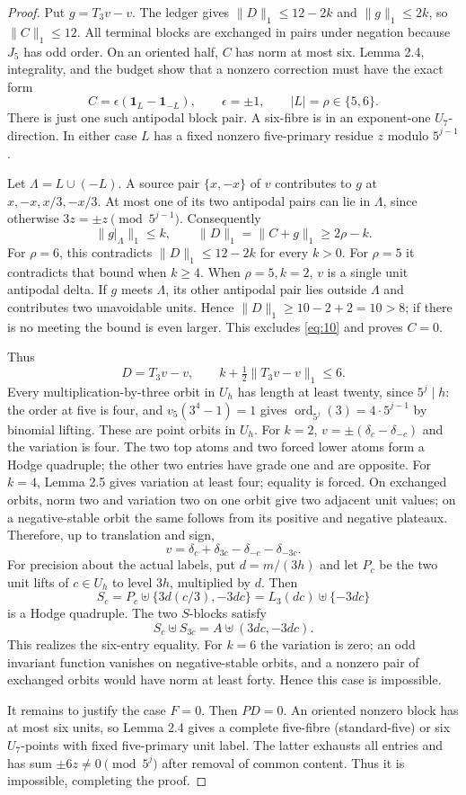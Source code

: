 \documentclass[11pt]{amsart}
\numberwithin{theorem}{section}
\theoremstyle{remark}
\numberwithin{equation}{section}
\begin{document}
\begin{proof}
Put \(g=T_3v-v\). The ledger gives \(\|D\|_1\le12-2k\) and
\(\|g\|_1\le2k\), so \(\|C\|_1\le12\). All terminal blocks are
exchanged in pairs under negation because \(J_5\) has odd order. On an
oriented half, \(C\) has norm at most six. Lemma 2.4, integrality, and
the budget show that a nonzero correction must have the exact form
\[
C=\epsilon(\mathbf1_L-\mathbf1_{-L}),\qquad
\epsilon=\pm1,\qquad |L|=\rho\in\{5,6\}.
\tag{10}\label{eq:10}
\]
There is just one such antipodal block pair. A six-fibre is in an
exponent-one \(U_7\)-direction. In either case \(L\) has a fixed nonzero
five-primary residue \(z\) modulo \(5^{j-1}\).

Let \(\Lambda=L\cup(-L)\). A source pair \(\{x,-x\}\) of \(v\)
contributes to \(g\) at \(x,-x,x/3,-x/3\). At most one of its two
antipodal pairs can lie in \(\Lambda\), since otherwise
\(3z=\pm z\pmod{5^{j-1}}\). Consequently
\[
\|g|_\Lambda\|_1\le k,\qquad
\|D\|_1=\|C+g\|_1\ge2\rho-k.
\tag{11}\label{eq:11}
\]
For \(\rho=6\), this contradicts \(\|D\|_1\le12-2k\) for every
\(k>0\). For \(\rho=5\) it contradicts that bound when \(k\ge4\).
When \(\rho=5,k=2\), \(v\) is a single unit antipodal delta. If
\(g\) meets \(\Lambda\), its other antipodal pair lies outside
\(\Lambda\) and contributes two unavoidable units. Hence
\(\|D\|_1\ge10-2+2=10>8\); if there is no meeting the bound is even
larger. This excludes \eqref{eq:10} and proves \(C=0\).

Thus
\[
D=T_3v-v,\qquad k+\tfrac12\|T_3v-v\|_1\le6.
\tag{12}\label{eq:12}
\]
Every multiplication-by-three orbit in \(U_h\) has length at least
twenty, since \(5^j\mid h\): the order at five is four, and
\(v_5(3^4-1)=1\) gives \(\operatorname{ord}_{5^j}(3)=4\cdot5^{j-1}\)
by binomial lifting. These are point orbits in \(U_h\). For \(k=2\),
\(v=\pm(\delta_c-\delta_{-c})\) and the variation is four. The two top
atoms and two forced lower atoms form a Hodge quadruple; the other two
entries have grade one and are opposite. For \(k=4\), Lemma 2.5 gives
variation at least four; equality is forced. On exchanged orbits, norm
two and variation two on one orbit give two adjacent unit values; on a
negative-stable orbit the same follows from its positive and negative
plateaux. Therefore, up to translation and sign,
\[
v=\delta_c+\delta_{3c}-\delta_{-c}-\delta_{-3c}.
\]
For precision about the actual labels, put \(d=m/(3h)\) and let \(P_c\)
be the two unit lifts of \(c\in U_h\) to level \(3h\), multiplied by
\(d\). Then
\[
S_c=P_c\uplus\{3d(c/3),-3dc\}=L_3(dc)\uplus\{-3dc\}
\]
is a Hodge quadruple. The two \(S\)-blocks satisfy
\[
S_c\uplus S_{3c}=A\uplus(3dc,-3dc).
\]
This realizes the six-entry equality. For \(k=6\) the variation is zero;
an odd invariant function vanishes on negative-stable orbits, and a
nonzero pair of exchanged orbits would have norm at least forty. Hence
this case is impossible.

It remains to justify the case \(F=0\). Then \(PD=0\). An oriented
nonzero block has at most six units, so Lemma 2.4 gives a complete
five-fibre (standard-five) or six \(U_7\)-points with fixed five-primary
unit label. The latter exhausts all entries and has sum
\(\pm6z\ne0\pmod{5^j}\) after removal of common content. Thus it is
impossible, completing the proof.
\end{proof}
\end{document}
